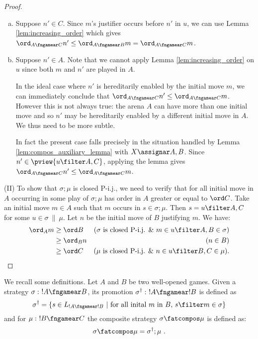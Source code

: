 \begin{proof}
\begin{enumerate}[1)]
\begin{itemize}[-]
            \begin{enumerate}[a.]
            \item Suppose $n'\in C$. Since $m$'s justifier occurs before $n'$ in $u$, we can use Lemma \ref{lem:increasing_order} which gives $\ord_{A\fngamear C} n' \leq \ord_{A\fngamear B} m
                = \ord_{A\fngamear C} m$.

            \item Suppose $n'\in A$.
        Note that we cannot apply Lemma \ref{lem:increasing_order} on $u$ since both $m$ and $n'$ are played in $A$.

        In the ideal case where $n'$ is hereditarily enabled by the initial move $m$, we can immediately conclude that $\ord_{A\fngamear C} n' \leq \ord_{A\fngamear C} m$. However this is not always true: the arena $A$ can have more than one initial move and so $n'$ may be hereditarily enabled by a different initial move in $A$. We thus need to be more subtle.

In fact the present case falls precisely in the situation handled by Lemma \ref{lem:compos_auxiliary_lemma} with $X \assignar A,B$. Since
$n' \in \pview{u \filter A,C}$, applying the lemma gives $\ord_{A\fngamear C} n' \leq \ord_{A\fngamear C} m$.

            \end{enumerate}
        \end{itemize}

    \end{enumerate}

\noindent (II)
To show that $\sigma;\mu$ is closed P-i.j., we need to verify that for all initial move in $A$ occurring in some play of $\sigma ; \mu$ has order in $A$ greater or equal to $\ord C$.
Take an initial move $m \in A$ such that $m$ occurs in $s \in \sigma ; \mu$. Then $s = u \filter A,C$ for some $u \in \sigma
\ \|\ \mu$. Let $n$ be the initial move of $B$ justifying $m$.
 We have:
\begin{align*}
\ord_A m & \geq \ord B & \mbox{($\sigma$ is closed P-i.j. \& $m \in u
\filter A,B \in \sigma$)} \\
 & \geq \ord_B n & \mbox{($n
\in B$)} \\
 & \geq \ord C & \mbox{($\mu$ is closed P-i.j. \& $n \in u
\filter B,C \in \mu$)}.
\end{align*}
\end{proof}
We recall some definitions. Let $A$ and $B$ be two well-opened games. Given a strategy  $\sigma :\ !A \fngamear B$, its promotion $\sigma^\dag :\ !A\fngamear !B$ is defined as
$$ \sigma^\dag = \{ s \in L_{!A\fngamear !B}\ |\ \mbox{for all inital $m$ in $B$, } s\filter m \in \sigma \}$$
and for $\mu :\ !B\fngamear C$ the composite strategy $\sigma \fatcompos \mu$ is defined as:
$$ \sigma \fatcompos \mu = \sigma^\dag ; \mu \ .$$

